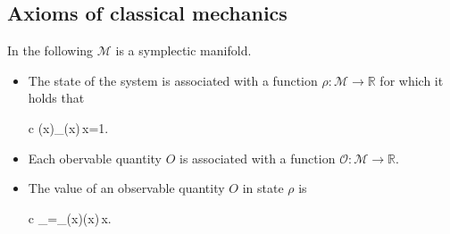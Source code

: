 \documentclass[11pt,oneside,%
]{memoir}
\newenvironment{eqna}{\begin{IEEEeqnarray}{c}}{\end{IEEEeqnarray}\ignorespacesafterend}
\newcommand{\RR}{\mathbb{R}}
\newcommand{\dd}{\mathrm{d}}
\begin{document}

\newpage

\subsection{Axioms of classical mechanics}

In the following \(\mathcal{M}\) is a symplectic manifold.

\begin{itemize}
    \item The state of the system is associated with a function \(\rho:\mathcal{M}\rightarrow\RR\) for which it holds that 
    \begin{eqna}
        \rho(x)\qquad{}\qquad\int_\rho(x)\,\dd x=1.\nonumber
    \end{eqna}
    \item Each obervable quantity \(O\) is associated with a function \(\mathcal{O}:\mathcal{M}\rightarrow\RR\).
    \item The value of an observable quantity \(O\) in state \(\rho\) is
    \begin{eqna}
        \langle{}\rangle_\rho=\int_\rho(x)(x)\,\dd x.\nonumber
    \end{eqna}
\end{itemize}
\end{document}
